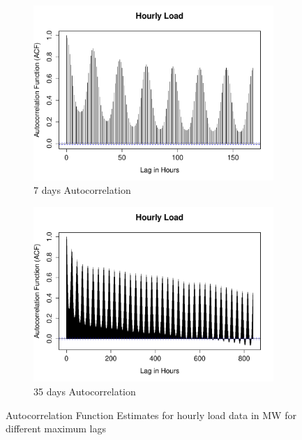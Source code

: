 \documentclass[conference]{IEEEtran}
\begin{document}
\begin{figure}[!ht]
\centering
\begin{subfigure}[b]{.49\linewidth}
\includegraphics[width=\linewidth]{gfx/acf-load-7days.pdf}
\caption{7 days Autocorrelation}
\label{subfig:acf-load-7days}
\end{subfigure}
\begin{subfigure}[b]{.49\linewidth}
\includegraphics[width=\linewidth]{gfx/acf-load-35days.pdf}
\caption{35 days Autocorrelation}
\label{subfig:acf-load-7days}
\end{subfigure}
\caption{Autocorrelation Function Estimates for hourly load data in MW for different maximum lags}
\label{fig:acf-load}
\end{figure}
\end{document}
